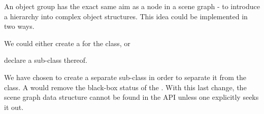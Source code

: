 	An object group has the exact same aim as a node in a scene graph - to introduce a hierarchy into complex object structures. This idea could be implemented in two ways.

	\begin{numlist}
		\item We could either create a  for the  class, or
		\item declare a sub-class thereof.
	\end{numlist}
	
	We have chosen to create a separate sub-class in order to separate it from the  class. A  would remove the black-box status of the . With this last change, the scene graph data structure cannot be found in the API unless one explicitly seeks it out.

